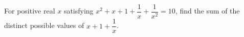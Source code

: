 For positive real $x$ satisfying $x^2+x+1+\dfrac{1}{x}+\dfrac{1}{x^2}=10$, find the sum of the distinct possible values of $x+1+\dfrac{1}{x}$.
